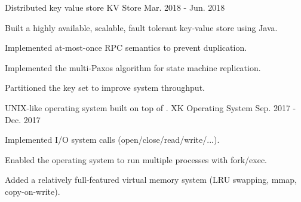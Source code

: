 \begin{cventries}
  \cventry
    {Distributed key value store} %
    {KV Store} %
    {} %
    {Mar. 2018 - Jun. 2018} %
    {
      \begin{cvitems} %
        \item{Built a highly available, scalable, fault tolerant key-value store using Java.}
        \item{Implemented at-most-once RPC semantics to prevent duplication.}
        \item{Implemented the multi-Paxos algorithm for state machine replication.}
        \item{Partitioned the key set to improve system throughput.}
      \end{cvitems}
    }


  \cventry
    {UNIX-like operating system built on top of \href{https://pdos.csail.mit.edu/6.828/2012/xv6.html}{\color{awesome-skyblue}{xv6}}.} %
    {XK Operating System} %
    {} %
    {Sep. 2017 - Dec. 2017} %
    {
      \begin{cvitems} %
        \item{Implemented I/O system calls (open/close/read/write/...).}
        \item{Enabled the operating system to run multiple processes with fork/exec.}
        \item{Added a relatively full-featured virtual memory system (LRU swapping, mmap, copy-on-write).}
      \end{cvitems}
    }
\end{cventries}